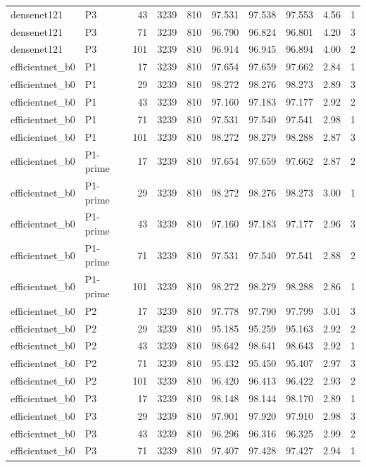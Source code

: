\begin{longtable}{p{2.25cm}p{1.1cm}rrrrrrrr}
densenet121 & P3 & 43 & 3239 & 810 & 97.531 & 97.538 & 97.553 & 4.56 & 1 \\ 
densenet121 & P3 & 71 & 3239 & 810 & 96.790 & 96.824 & 96.801 & 4.20 & 3 \\ 
densenet121 & P3 & 101 & 3239 & 810 & 96.914 & 96.945 & 96.894 & 4.00 & 2 \\ 
efficientnet\_b0 & P1 & 17 & 3239 & 810 & 97.654 & 97.659 & 97.662 & 2.84 & 1 \\ 
efficientnet\_b0 & P1 & 29 & 3239 & 810 & 98.272 & 98.276 & 98.273 & 2.89 & 3 \\ 
efficientnet\_b0 & P1 & 43 & 3239 & 810 & 97.160 & 97.183 & 97.177 & 2.92 & 2 \\ 
efficientnet\_b0 & P1 & 71 & 3239 & 810 & 97.531 & 97.540 & 97.541 & 2.98 & 1 \\ 
efficientnet\_b0 & P1 & 101 & 3239 & 810 & 98.272 & 98.279 & 98.288 & 2.87 & 3 \\ 
efficientnet\_b0 & P1-prime & 17 & 3239 & 810 & 97.654 & 97.659 & 97.662 & 2.87 & 2 \\ 
efficientnet\_b0 & P1-prime & 29 & 3239 & 810 & 98.272 & 98.276 & 98.273 & 3.00 & 1 \\ 
efficientnet\_b0 & P1-prime & 43 & 3239 & 810 & 97.160 & 97.183 & 97.177 & 2.96 & 3 \\ 
efficientnet\_b0 & P1-prime & 71 & 3239 & 810 & 97.531 & 97.540 & 97.541 & 2.88 & 2 \\ 
efficientnet\_b0 & P1-prime & 101 & 3239 & 810 & 98.272 & 98.279 & 98.288 & 2.86 & 1 \\ 
efficientnet\_b0 & P2 & 17 & 3239 & 810 & 97.778 & 97.790 & 97.799 & 3.01 & 3 \\ 
efficientnet\_b0 & P2 & 29 & 3239 & 810 & 95.185 & 95.259 & 95.163 & 2.92 & 2 \\ 
efficientnet\_b0 & P2 & 43 & 3239 & 810 & 98.642 & 98.641 & 98.643 & 2.92 & 1 \\ 
efficientnet\_b0 & P2 & 71 & 3239 & 810 & 95.432 & 95.450 & 95.407 & 2.97 & 3 \\ 
efficientnet\_b0 & P2 & 101 & 3239 & 810 & 96.420 & 96.413 & 96.422 & 2.93 & 2 \\ 
efficientnet\_b0 & P3 & 17 & 3239 & 810 & 98.148 & 98.144 & 98.170 & 2.89 & 1 \\ 
efficientnet\_b0 & P3 & 29 & 3239 & 810 & 97.901 & 97.920 & 97.910 & 2.98 & 3 \\ 
efficientnet\_b0 & P3 & 43 & 3239 & 810 & 96.296 & 96.316 & 96.325 & 2.99 & 2 \\ 
efficientnet\_b0 & P3 & 71 & 3239 & 810 & 97.407 & 97.428 & 97.427 & 2.94 & 1 \\ 

\end{longtable}

